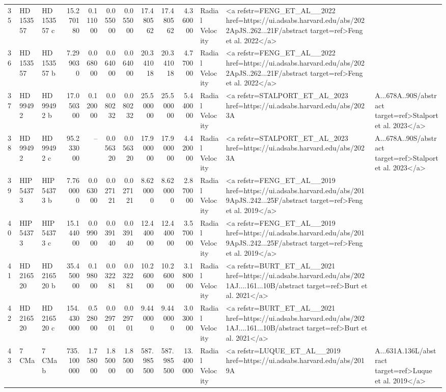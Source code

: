 \begin{tabular}{lllrrrrrrrll}
35 & HD 153557 & HD 153557 c & 15.270180 & 0.111000 & 0.055000 & 0.055000 & 17.480562 & 17.480562 & 4.360000 & Radial Velocity & <a refstr=FENG_ET_AL__2022 href=https://ui.adsabs.harvard.edu/abs/2022ApJS..262...21F/abstract target=ref>Feng et al. 2022</a> \\
36 & HD 153557 & HD 153557 b & 7.299030 & 0.068000 & 0.064000 & 0.064000 & 20.341018 & 20.341018 & 4.770000 & Radial Velocity & <a refstr=FENG_ET_AL__2022 href=https://ui.adsabs.harvard.edu/abs/2022ApJS..262...21F/abstract target=ref>Feng et al. 2022</a> \\
37 & HD 99492 & HD 99492 b & 17.050300 & 0.120000 & 0.080232 & 0.080232 & 25.500000 & 25.500000 & 5.440000 & Radial Velocity & <a refstr=STALPORT_ET_AL_2023 href=https://ui.adsabs.harvard.edu/abs/2023A&A...678A..90S/abstract target=ref>Stalport et al. 2023</a> \\
38 & HD 99492 & HD 99492 c & 95.233000 & -- & 0.056320 & 0.056320 & 17.900000 & 17.900000 & 4.420000 & Radial Velocity & <a refstr=STALPORT_ET_AL_2023 href=https://ui.adsabs.harvard.edu/abs/2023A&A...678A..90S/abstract target=ref>Stalport et al. 2023</a> \\
39 & HIP 54373 & HIP 54373 b & 7.760000 & 0.063000 & 0.027121 & 0.027121 & 8.620000 & 8.620000 & 2.870000 & Radial Velocity & <a refstr=FENG_ET_AL__2019 href=https://ui.adsabs.harvard.edu/abs/2019ApJS..242...25F/abstract target=ref>Feng et al. 2019</a> \\
40 & HIP 54373 & HIP 54373 c & 15.144000 & 0.099000 & 0.039140 & 0.039140 & 12.440000 & 12.440000 & 3.570000 & Radial Velocity & <a refstr=FENG_ET_AL__2019 href=https://ui.adsabs.harvard.edu/abs/2019ApJS..242...25F/abstract target=ref>Feng et al. 2019</a> \\
41 & HD 216520 & HD 216520 b & 35.450000 & 0.198000 & 0.032281 & 0.032281 & 10.260000 & 10.260000 & 3.180000 & Radial Velocity & <a refstr=BURT_ET_AL__2021 href=https://ui.adsabs.harvard.edu/abs/2021AJ....161...10B/abstract target=ref>Burt et al. 2021</a> \\
42 & HD 216520 & HD 216520 c & 154.430000 & 0.528000 & 0.029701 & 0.029701 & 9.440000 & 9.440000 & 3.030000 & Radial Velocity & <a refstr=BURT_ET_AL__2021 href=https://ui.adsabs.harvard.edu/abs/2021AJ....161...10B/abstract target=ref>Burt et al. 2021</a> \\
43 & 7 CMa & 7 CMa b & 735.100000 & 1.758000 & 1.850000 & 1.850000 & 587.985500 & 587.985500 & 13.400000 & Radial Velocity & <a refstr=LUQUE_ET_AL__2019 href=https://ui.adsabs.harvard.edu/abs/2019A&A...631A.136L/abstract target=ref>Luque et al. 2019</a> \\

\end{tabular}
